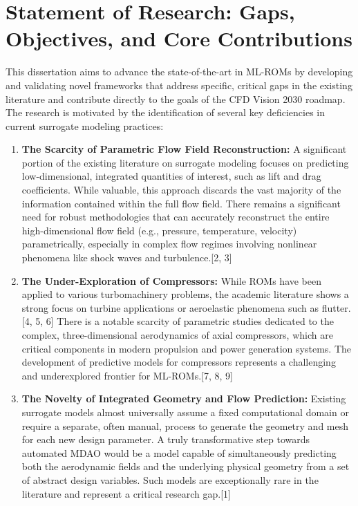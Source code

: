 \documentclass[12pt, a4paper]{report}
\begin{document}
\section{Statement of Research: Gaps, Objectives, and Core Contributions}

This dissertation aims to advance the state-of-the-art in ML-ROMs by developing and validating novel frameworks that address specific, critical gaps in the existing literature and contribute directly to the goals of the CFD Vision 2030 roadmap. The research is motivated by the identification of several key deficiencies in current surrogate modeling practices:

\begin{enumerate}
    \item \textbf{The Scarcity of Parametric Flow Field Reconstruction:} A significant portion of the existing literature on surrogate modeling focuses on predicting low-dimensional, integrated quantities of interest, such as lift and drag coefficients. While valuable, this approach discards the vast majority of the information contained within the full flow field. There remains a significant need for robust methodologies that can accurately reconstruct the entire high-dimensional flow field (e.g., pressure, temperature, velocity) parametrically, especially in complex flow regimes involving nonlinear phenomena like shock waves and turbulence.[2, 3]
    \item \textbf{The Under-Exploration of Compressors:} While ROMs have been applied to various turbomachinery problems, the academic literature shows a strong focus on turbine applications or aeroelastic phenomena such as flutter.[4, 5, 6] There is a notable scarcity of parametric studies dedicated to the complex, three-dimensional aerodynamics of axial compressors, which are critical components in modern propulsion and power generation systems. The development of predictive models for compressors represents a challenging and underexplored frontier for ML-ROMs.[7, 8, 9]
    \item \textbf{The Novelty of Integrated Geometry and Flow Prediction:} Existing surrogate models almost universally assume a fixed computational domain or require a separate, often manual, process to generate the geometry and mesh for each new design parameter. A truly transformative step towards automated MDAO would be a model capable of simultaneously predicting both the aerodynamic fields and the underlying physical geometry from a set of abstract design variables. Such models are exceptionally rare in the literature and represent a critical research gap.[1]
\end{enumerate}
\end{document}
